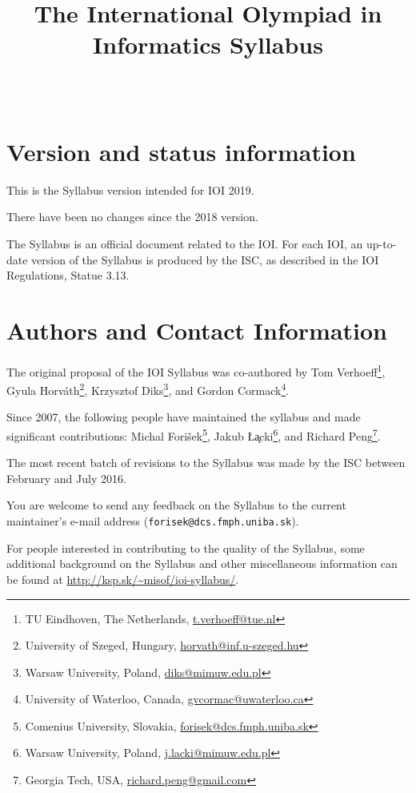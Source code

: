 \documentclass[a4paper,11pt,oneside]{article}
\newcommand{\new}[1]{{\bf \color{red}{#1}}}
\begin{document}
\title{\sf The International Olympiad in Informatics Syllabus}
\date{~}
\maketitle

\section{Version and status information}%

This is the Syllabus version intended for IOI 2019.

\medskip

There have been no changes since the 2018 version.

\medskip

The Syllabus is an official document related to the IOI.
For each IOI, an up-to-date version of
the Syllabus is produced by the ISC, as described in the IOI Regulations, Statue 3.13.

\section{Authors and Contact Information}%

The original proposal of the IOI Syllabus was co-authored by
{Tom Verhoeff}\footnote{TU Eindhoven, The Netherlands, \url{t.verhoeff@tue.nl}},
{Gyula Horv\'ath}\footnote{University of Szeged, Hungary, \url{horvath@inf.u-szeged.hu}},
{Krzysztof Diks}\footnote{Warsaw University, Poland, \url{diks@mimuw.edu.pl}},
and
{Gordon Cormack}\footnote{University of Waterloo, Canada, \url{gvcormac@uwaterloo.ca}}.

Since 2007, the following people have maintained the syllabus and made significant contributions:
{Michal Fori\v{s}ek}\footnote{Comenius University, Slovakia, \url{forisek@dcs.fmph.uniba.sk}},
{Jakub \L{}\c{a}cki}\footnote{Warsaw University, Poland, \url{j.lacki@mimuw.edu.pl}},
and
{Richard Peng}\footnote{Georgia Tech, USA, \url{richard.peng@gmail.com}}.

The most recent batch of revisions to the Syllabus was made by the ISC between February and July 2016.

You are welcome to send any feedback on the Syllabus to
the current maintainer's e-mail address (\verb!forisek@dcs.fmph.uniba.sk!).

For people interested in contributing to the quality of the Syllabus, some additional 
background on the Syllabus and other miscellaneous information can be found at
\url{http://ksp.sk/~misof/ioi-syllabus/}.
\end{document}
